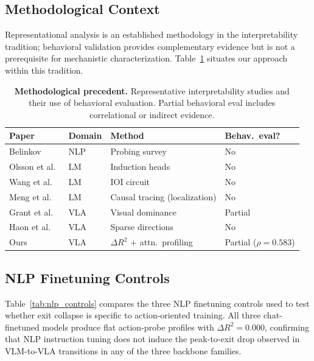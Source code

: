 \subsection{Methodological Context}
Representational analysis is an established methodology in the interpretability tradition; behavioral validation provides complementary evidence but is not a prerequisite for mechanistic characterization.
Table~\ref{tab:methodological_precedent} situates our approach within this tradition.

\begin{table}[h]
\centering
\caption{\textbf{Methodological precedent.} Representative interpretability studies and their use of behavioral evaluation. Partial behavioral eval includes correlational or indirect evidence.}
\label{tab:methodological_precedent}
\small
\begin{tabular}{@{}llll@{}}
\toprule
\textbf{Paper} & \textbf{Domain} & \textbf{Method} & \textbf{Behav.\ eval?} \\
\midrule
Belinkov~\cite{belinkov2022} & NLP & Probing survey & No \\
Olsson et al.~\cite{olsson2022} & LM & Induction heads & No \\
Wang et al.~\cite{wang2023_ioi} & LM & IOI circuit & No \\
Meng et al.~\cite{meng2022_rome} & LM & Causal tracing (localization) & No \\
Grant et al.~\cite{grant2026} & VLA & Visual dominance & Partial \\
Haon et al.~\cite{haon2025} & VLA & Sparse directions & No \\
\midrule
Ours & VLA & $\Delta R^2$ + attn.\ profiling & Partial ($\rho{=}0.583$) \\
\bottomrule
\end{tabular}
\end{table}

\subsection{NLP Finetuning Controls}
\label{sec:nlp_control_appendix}

Table~\ref{tab:nlp_controls} compares the three NLP finetuning controls used to test whether exit collapse is specific to action-oriented training.
All three chat-finetuned models produce flat action-probe profiles with $\Delta R^2 = 0.000$, confirming that NLP instruction tuning does not induce the peak-to-exit drop observed in VLM-to-VLA transitions in any of the three backbone families.

